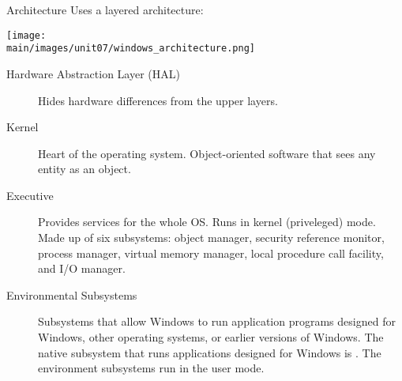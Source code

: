 \documentclass[\main/notes.tex]{subfiles}
\begin{document}
				\begin{definition}{Architecture}
					Uses a layered architecture:
					\begin{center}
						\texttt{[image: \\main/images/unit07/windows\_architecture.png]}
					\end{center}
					\begin{description}
						\item[Hardware Abstraction Layer (HAL)] Hides hardware differences from the upper layers.
						\item[Kernel] Heart of the operating system. Object-oriented software that sees any entity as an object.
						\item[Executive] Provides services for the whole OS. Runs in kernel (priveleged) mode. Made up of six subsystems: object manager, security reference monitor, process manager, virtual memory manager, local procedure call facility, and I/O manager.
						\item[Environmental Subsystems] Subsystems that allow Windows to run application programs designed for Windows, other operating systems, or earlier versions of Windows. The native subsystem that runs applications designed for Windows is . The environment subsystems run in the user mode.
					\end{description}
				\end{definition}
\end{document}
